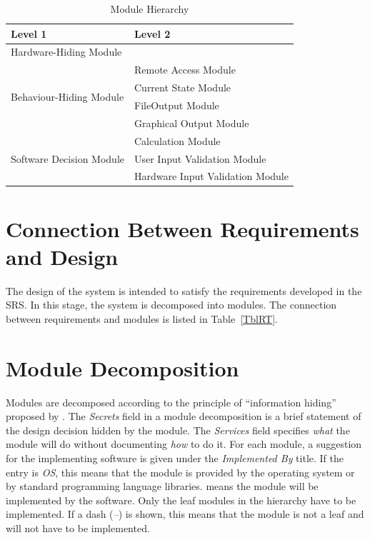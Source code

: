 \documentclass[12pt, titlepage]{article}
\begin{document}
\begin{table}[h!]
\centering
\begin{tabular}{p{} p{}}
\toprule
\textbf{Level 1} & \textbf{Level 2}\\
\midrule

{Hardware-Hiding Module} & ~ \\
\midrule

\multirow{4}{0.3\textwidth}{Behaviour-Hiding Module}
& Remote Access Module\\
& Current State Module\\
& FileOutput Module\\
& Graphical Output Module\\ 
\midrule

\multirow{3}{0.3\textwidth}{Software Decision Module}
& Calculation Module\\
& User Input Validation Module \\
& Hardware Input Validation Module\\ 
\bottomrule

\end{tabular}
\caption{Module Hierarchy}
\label{TblMH}
\end{table}

\section{Connection Between Requirements and Design} \label{SecConnection}

The design of the system is intended to satisfy the requirements developed in
the SRS. In this stage, the system is decomposed into modules. The connection
between requirements and modules is listed in Table~\ref{TblRT}.

\section{Module Decomposition} \label{SecMD}
Modules are decomposed according to the principle of ``information hiding''
proposed by \citet{ParnasEtAl1984}. The \emph{Secrets} field in a module
decomposition is a brief statement of the design decision hidden by the
module. The \emph{Services} field specifies \emph{what} the module will do
without documenting \emph{how} to do it. For each module, a suggestion for the
implementing software is given under the \emph{Implemented By} title. If the
entry is \emph{OS}, this means that the module is provided by the operating
system or by standard programming language libraries.  \emph{\progname{}} means the
module will be implemented by the \progname{} software.
Only the leaf modules in the hierarchy have to be implemented. If a dash
(\emph{--}) is shown, this means that the module is not a leaf and will not have
to be implemented.
\end{document}
